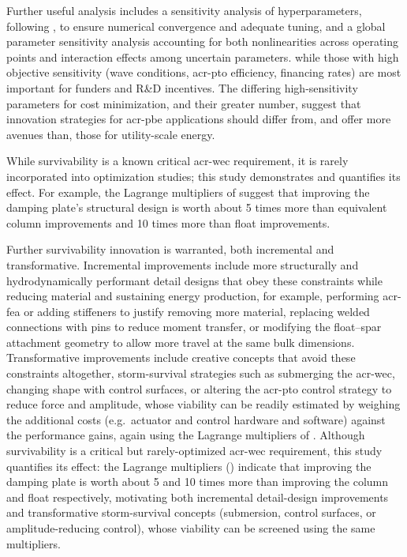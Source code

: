     Further useful analysis includes a sensitivity analysis of hyperparameters, following , to ensure numerical convergence and adequate tuning, and a global parameter sensitivity analysis accounting for both nonlinearities across operating points and interaction effects among uncertain parameters.
\else
    while those with high objective sensitivity (wave conditions, \gls{acr-pto} efficiency, financing rates) are most important for funders and R\&D incentives.
    The differing high-sensitivity parameters for cost minimization, and their greater number, suggest that 
    innovation strategies for \gls{acr-pbe} applications should differ from, and offer more avenues than, those for utility-scale energy.
\fi

\ifdefined\DISSERTATION
    While survivability is a known critical \gls{acr-wec} requirement, it is rarely incorporated into optimization studies; this study demonstrates and quantifies its effect.
    For example, the Lagrange multipliers of  suggest that improving the damping plate's structural design is worth about 5 times more than equivalent column improvements and 10 times more than float improvements.
    
    Further survivability innovation is warranted, both incremental and transformative.
    Incremental improvements include more structurally and hydrodynamically performant detail designs that obey these constraints while reducing material and sustaining energy production, for example, performing \gls{acr-fea} or adding stiffeners to justify removing more material, replacing welded connections with pins to reduce moment transfer, or modifying the float--spar attachment geometry to allow more travel at the same bulk dimensions.
    Transformative improvements include creative concepts that avoid these constraints altogether, storm-survival strategies such as submerging the \gls{acr-wec}, changing shape with control surfaces, or altering the \gls{acr-pto} control strategy to reduce force and amplitude, whose viability can be readily estimated by weighing the additional costs (e.g.\ actuator and control hardware and software) against the performance gains, again using the Lagrange multipliers of .
\else
    Although survivability is a critical but rarely-optimized \gls{acr-wec} requirement, this study quantifies its effect:
    the Lagrange multipliers () indicate that improving the damping plate is worth about 5 and 10 times more than improving the column and float respectively,
    motivating both incremental detail-design improvements and transformative storm-survival concepts (submersion, control surfaces, or amplitude-reducing control), whose viability can be screened using the same multipliers.
\fi

